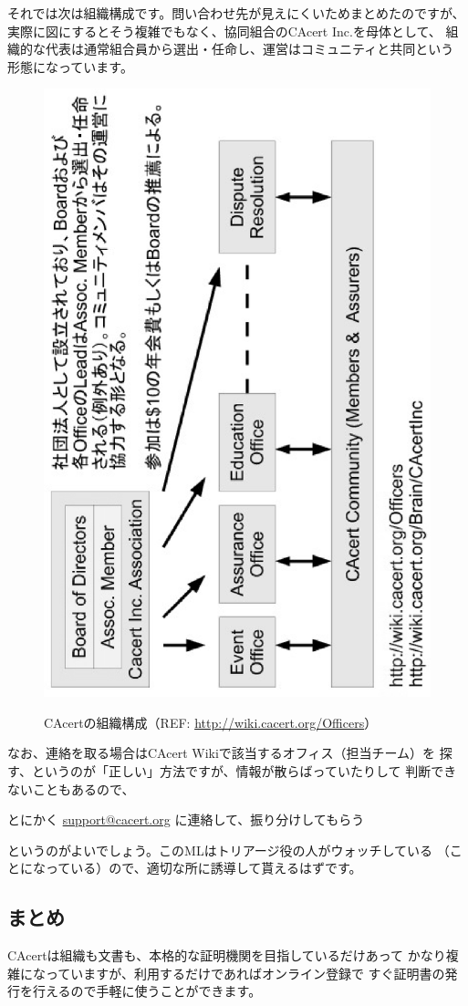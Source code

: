 \documentclass[mingoth,a4paper]{jsarticle}
\begin{document}
それでは次は組織構成です。問い合わせ先が見えにくいためまとめたのですが、
実際に図にするとそう複雑でもなく、協同組合のCAcert Inc.を母体として、
組織的な代表は通常組合員から選出・任命し、運営はコミュニティと共同という
形態になっています。

\begin{figure}[H]
\begin{center}
\vspace{15mm}
\includegraphics[width=0.6\hsize,angle=270]{image201012/cacertorg.eps}
\label{fig:cacertorg}
\end{center}
\caption{CAcertの組織構成（REF: \url{http://wiki.cacert.org/Officers}）}
\end{figure}

なお、連絡を取る場合はCAcert Wikiで該当するオフィス（担当チーム）を
探す、というのが「正しい」方法ですが、情報が散らばっていたりして
判断できないこともあるので、
\begin{center}
\Large{とにかく \url{support@cacert.org} に連絡して、振り分けしてもらう}
\end{center}
というのがよいでしょう。このMLはトリアージ役の人がウォッチしている
（ことになっている）ので、適切な所に誘導して貰えるはずです。

\subsection{まとめ}
CAcertは組織も文書も、本格的な証明機関を目指しているだけあって
かなり複雑になっていますが、利用するだけであればオンライン登録で
すぐ証明書の発行を行えるので手軽に使うことができます。
\end{document}
